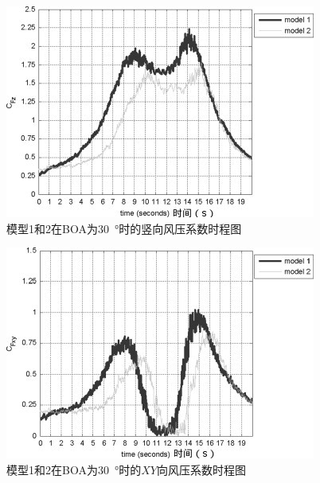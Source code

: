 \documentclass{ctexart}
\begin{document}
\begin{figure}[h]
\centering
\includegraphics{./fig/5.jpg}
\caption{模型1和2在BOA为\SI{30}{\degree}时的竖向风压系数时程图}
\label{fig:Cfz}
\end{figure}

\begin{figure}[h]
\centering
\includegraphics{./fig/6.jpg}
\caption{模型1和2在BOA为\SI{30}{\degree}时的$XY$向风压系数时程图}
\label{fig:Cfxy}
\end{figure}
\end{document}
